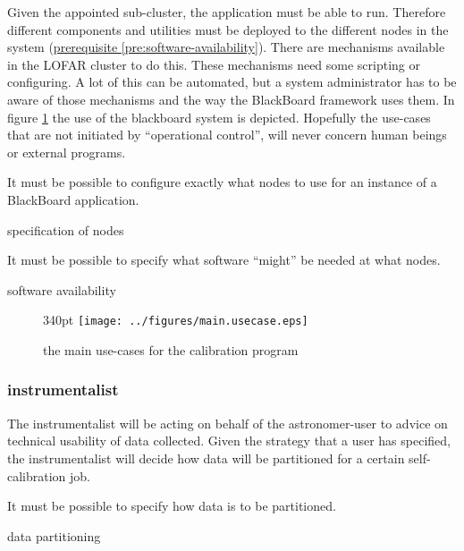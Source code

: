 \documentclass[]{lofar}
\begin{document}
        Given the appointed sub-cluster, the application must be able
        to run. Therefore different components and utilities must be
        deployed to the different nodes in the system
        (\hyperlink{pre:software-availability}{prerequisite \ref{pre:software-availability}}). There are
        mechanisms available in the LOFAR cluster to do this. These
        mechanisms need some scripting or configuring. A lot of this
        can be automated, but a system administrator has to be aware
        of those mechanisms and the way the BlackBoard framework uses
        them. In figure
        \hyperlink{fig:main.usecase}{\ref{fig:main.usecase}} the use
        of the blackboard system is depicted. Hopefully the use-cases
        that are not initiated by ``operational control'', will never
        concern human beings or external programs.

        \begin{requirement}
          It must be possible to configure exactly what nodes to use
          for an instance of a BlackBoard application.
          \caption{specification of nodes\label{req:specification-of-nodes}}
        \end{requirement}

        \begin{prerequisite}
          It must be possible to specify what software ``might'' be
          needed at what nodes.
          \caption{software availability\label{pre:software-availability}}
        \end{prerequisite}

        \begin{figure}{340pt}
          \texttt{[image: ../figures/main.usecase.eps]}
          \hypertarget{fig:main.usecase}{}
          \caption{the main use-cases for the calibration program\label{fig:main.usecase}}
        \end{figure}

      \subsubsection{instrumentalist}

        The instrumentalist will be acting on behalf of the
        astronomer-user to advice on technical usability of data
        collected. Given the strategy that a user has specified, the
        instrumentalist will decide how data will be partitioned for a
        certain self-calibration job.

        \begin{requirement}
          It must be possible to specify how data is to be partitioned.
          \caption{data partitioning\label{req:data-partitioning}}
        \end{requirement}
\end{document}
